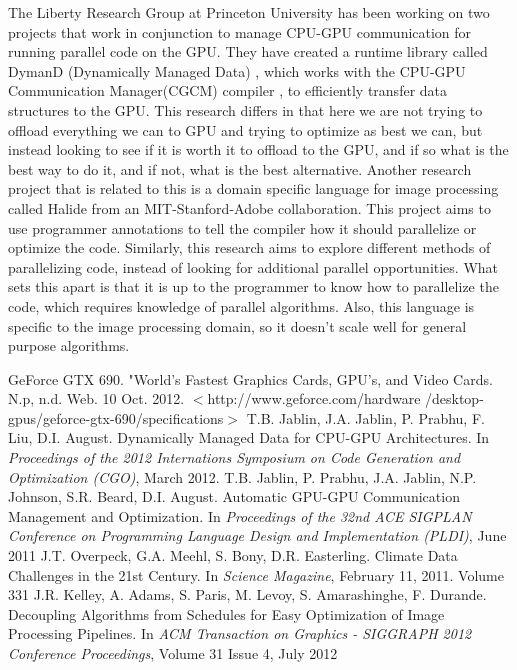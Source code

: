 \documentclass[a4paper,12pt]{article}
\begin{document}
The Liberty Research Group at Princeton University has been working on two projects that work in conjunction to manage CPU-GPU communication for running parallel code on the GPU.  They have created a runtime library called DymanD (Dynamically Managed Data) \cite{dymand}, which works with the CPU-GPU Communication Manager(CGCM) compiler \cite{cgcm}, to efficiently transfer data structures to the GPU.  This research differs in that here we are not trying to offload everything we can to GPU and trying to optimize as best we can, but instead looking to see if it is worth it to offload to the GPU, and if so what is the best way to do it, and if not, what is the best alternative.  Another research project that is related to this is a domain specific language for image processing called Halide from an MIT-Stanford-Adobe collaboration\cite{halide}.  This project aims to use programmer annotations to tell the compiler how it should parallelize or optimize the code.  Similarly, this research aims to explore different methods of parallelizing code, instead of looking for additional parallel opportunities.  What sets this apart is that it is up to the programmer to know how to parallelize the code, which requires knowledge of parallel algorithms.  Also, this language is specific to the image processing domain, so it doesn't scale well for general purpose algorithms. 
\begin{thebibliography}{9}
\footnotesize
\vspace{-2ex}
 GeForce GTX 690. "World's Fastest Graphics Cards, GPU's, and Video Cards. N.p, n.d. Web. 10 Oct. 2012.
 $<$http://www.geforce.com/hardware /desktop-gpus/geforce-gtx-690/specifications$>$
\vspace{-2ex}
 T.B. Jablin, J.A. Jablin, P. Prabhu, F. Liu, D.I. August. Dynamically Managed Data for CPU-GPU Architectures. In \textit{Proceedings of the 2012 Internations Symposium on Code Generation and Optimization (CGO)}, March 2012.
\vspace{-2ex}
T.B. Jablin, P. Prabhu, J.A. Jablin, N.P. Johnson, S.R. Beard, D.I. August. Automatic GPU-GPU Communication Management and Optimization. In \textit{Proceedings of the 32nd ACE SIGPLAN Conference on Programming Language Design and Implementation (PLDI)}, June 2011
\vspace{-2ex}
 J.T. Overpeck, G.A. Meehl, S. Bony, D.R. Easterling.  Climate Data Challenges in the 21st Century.  In \textit{Science Magazine}, February 11, 2011.  Volume 331
\vspace{-2ex}
 J.R. Kelley, A. Adams, S. Paris, M. Levoy, S. Amarashinghe, F. Durande.  Decoupling Algorithms from Schedules for Easy Optimization of Image Processing Pipelines.  In \textit{ACM Transaction on Graphics - SIGGRAPH 2012 Conference Proceedings}, Volume 31 Issue 4, July 2012
\end{thebibliography}
\end{document}
